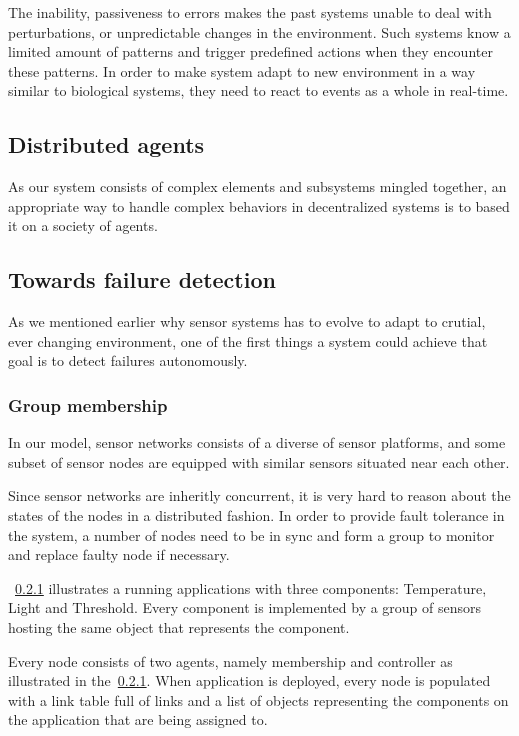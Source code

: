 The inability, passiveness to errors makes the past systems unable to deal with
perturbations, or unpredictable changes in the environment. Such systems know
a limited amount of patterns and trigger predefined actions when they encounter
these patterns. In order to make system adapt to new environment in a way
similar to biological systems, they need to react to events as a whole in
real-time.

\subsection{Distributed agents}

As our system consists of complex elements and subsystems mingled together, an
appropriate way to handle complex behaviors in decentralized systems is to
based it on a society of agents.~\cite{Minar1999}

\subsection{Towards failure detection}

As we mentioned earlier why sensor systems has to evolve to adapt to crutial,
ever changing environment, one of the first things a system could achieve that
goal is to detect failures autonomously.

\subsubsection{Group membership}

In our model, sensor networks consists of a diverse of sensor platforms, and some
subset of sensor nodes are equipped with similar sensors situated near each other.

Since sensor networks are inheritly concurrent, it is very hard to reason about
the states of the nodes in a distributed fashion. In order to provide fault
tolerance in the system, a number of nodes need to be in sync and form a group
to monitor and replace faulty node if necessary.

~\ref{} illustrates a running applications with three components: Temperature,
Light and Threshold. Every component is implemented by a group of sensors
hosting the same object that represents the component.

Every node consists of two agents, namely membership and controller as
illustrated in the~\ref{}. When application is deployed, every node is populated with a link table full of links and a list of objects representing the components on the application that are being assigned to.

